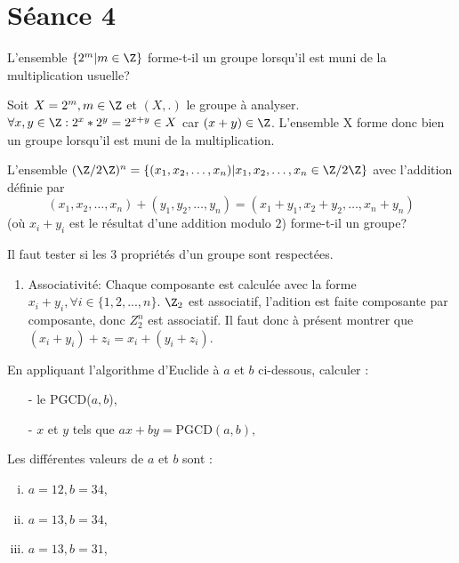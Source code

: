 
\section{Séance 4}

\begin{exo}
L'ensemble $\{2^m | m \in \Z\}$ forme-t-il un groupe lorsqu'il est muni de la multiplication usuelle?
\end{exo}

Soit $X=2^{m}, m \in \Z$ et $(X,.)$ le groupe à analyser. \\

$\forall x,y \in \Z : 2^{x} * 2^{y} = 2^{x+y} \in X$ car $(x+y) \in \Z$. L'ensemble X forme donc bien un groupe lorsqu'il est muni de la multiplication. 


\vspace*{0.8cm}
\begin{exo}
L'ensemble $(\Z/2\Z)^n=\{(x_1,x_2,\ldots,x_n)|x_1,x_2,\ldots,x_n\in \Z/2\Z\}$ avec l'addition d\'efinie par $$(x_1,x_2,\ldots,x_n)+(y_1,y_2,\ldots,y_n)=(x_1+y_1,x_2+y_2,\ldots,x_n+y_n)$$
(o\`u $x_i+y_i$ est le r\'esultat d'une addition modulo $2$) forme-t-il un groupe?
\end{exo}

Il faut tester si les 3 propriétés d'un groupe sont respectées.

\begin{enumerate}
\item Associativité: Chaque composante est calculée avec la forme $x_{i}+y_{i}, \forall i \in \{ 1,2,...,n \}$. $\Z_{2}$ est associatif, l'adition est faite composante par composante, donc $Z_{2}^{n}$ est associatif. Il faut donc à présent montrer que $(x_{i}+y_{i}) + z_{i} = x_{i} + (y_{i} + z_{i})$.
\end{enumerate}


\vspace*{0.8cm}
\begin{exo}
En appliquant l'algorithme d'Euclide \`a $a$ et $b$ ci-dessous, calculer :
\begin{itemize}
\item[-] le PGCD($a,b$),
\item[-] $x$ et $y$ tels que $ ax + by = \text{PGCD}(a,b),$
\end{itemize}
Les diff\'erentes valeurs de $a$ et $b$ sont :
\begin{enumerate}[(i)]
\item $a = 12, b = 34$,
\item $a = 13, b = 34$,
\item $a = 13, b = 31$,
\end{enumerate}
\end{exo}

